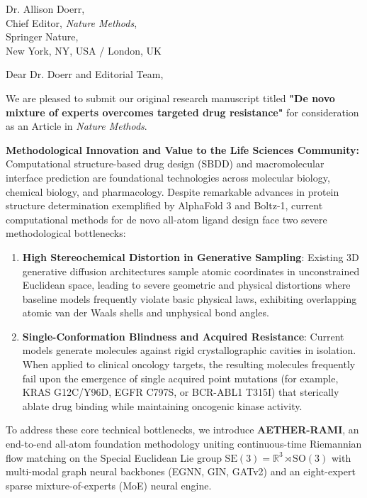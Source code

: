 \documentclass[11pt]{letter}
\begin{document}
\begin{letter}{%
    Dr. Allison Doerr,\\
    Chief Editor, \textit{Nature Methods},\\
    Springer Nature,\\
    New York, NY, USA / London, UK
}

\opening{Dear Dr. Doerr and Editorial Team,}

We are pleased to submit our original research manuscript titled \textbf{"De novo mixture of experts overcomes targeted drug resistance"} for consideration as an Article in \textit{Nature Methods}.

\textbf{Methodological Innovation and Value to the Life Sciences Community:}\\
Computational structure-based drug design (SBDD) and macromolecular interface prediction are foundational technologies across molecular biology, chemical biology, and pharmacology. Despite remarkable advances in protein structure determination exemplified by AlphaFold 3 and Boltz-1, current computational methods for de novo all-atom ligand design face two severe methodological bottlenecks:
\begin{enumerate}
    \item \textbf{High Stereochemical Distortion in Generative Sampling}: Existing 3D generative diffusion architectures sample atomic coordinates in unconstrained Euclidean space, leading to severe geometric and physical distortions where baseline models frequently violate basic physical laws, exhibiting overlapping atomic van der Waals shells and unphysical bond angles.
    \item \textbf{Single-Conformation Blindness and Acquired Resistance}: Current models generate molecules against rigid crystallographic cavities in isolation. When applied to clinical oncology targets, the resulting molecules frequently fail upon the emergence of single acquired point mutations (for example, KRAS G12C/Y96D, EGFR C797S, or BCR-ABL1 T315I) that sterically ablate drug binding while maintaining oncogenic kinase activity.
\end{enumerate}

To address these core technical bottlenecks, we introduce \textbf{AETHER-RAMI}, an end-to-end all-atom foundation methodology uniting continuous-time Riemannian flow matching on the Special Euclidean Lie group $\mathrm{SE}(3) = \mathbb{R}^3 \rtimes \mathrm{SO}(3)$ with multi-modal graph neural backbones (EGNN, GIN, GATv2) and an eight-expert sparse mixture-of-experts (MoE) neural engine.


\end{letter}
\end{document}
